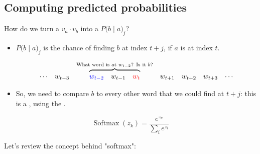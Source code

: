     \phantom{}

    \subsection{Computing predicted probabilities}

        How do we turn a  $v_a \cdot v_b$ into a  $P\big(b \; | \; a\big)_j$? 

        \begin{itemize}
            \item $P\big(b \; | \; a\big)_j$ is the chance of finding $b$ at index $t+j$, if $a$ is at index $t$.

            \begin{equation}
                \begin{matrix}
                    \cdots & w_{t-3} & 
                    \overbrace{
                    \begin{matrix}
                        \textcolor{blue}{w_{t-2}} & w_{t-1} & \textcolor{red}{w_t} 
                    \end{matrix} 
                    }^{\text{What word is at $w_{t-2}$? Is it $b$?}}
                    & w_{t+1} & w_{t+2}
                    & w_{t+3} & \cdots
                \end{matrix}
            \end{equation}
            \item So, we need to compare $b$ to every other word that we could find at $t+j$: this is a , using the .
        \end{itemize}

        \begin{equation}
            \operatorname{Softmax}(z_k) = \frac{e^{z_k}}{ \sum_i e^{z_i}}
        \end{equation}

        Let's review the concept behind "softmax":\\

